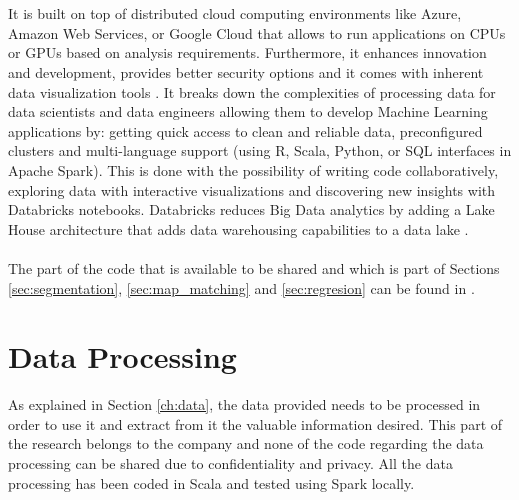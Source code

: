 \\
\\
It is built on top of distributed cloud computing environments like Azure, Amazon Web Services, or Google Cloud that allows to run applications on CPUs or GPUs based on analysis requirements. Furthermore, it enhances innovation and development, provides better security options and it comes with inherent data visualization tools \cite{databricks2}.
It breaks down the complexities of processing data for data scientists and data engineers allowing them to develop Machine Learning applications by: getting quick access to clean and reliable data, preconfigured clusters and multi-language support (using R, Scala, Python, or SQL interfaces in Apache Spark). This is done with the possibility of writing code collaboratively, exploring data with interactive visualizations and discovering new insights with Databricks notebooks. 
Databricks reduces Big Data analytics by adding a Lake House architecture that adds data warehousing capabilities to a data lake \cite{databricks3}.
\\
\\ 
The part of the code that is available to be shared and which is part of Sections \ref{sec:segmentation}, \ref{sec:map_matching} and \ref{sec:regresion} can be found in \cite{git}.


\section{Data Processing}
\label{sec:data_processing}
As explained in Section \ref{ch:data}, the data provided needs to be processed in order to use it and extract from it the valuable information desired. This part of the research belongs to the company and none of the code regarding the data processing can be shared due to confidentiality and privacy. All the data processing has been coded in Scala and tested using Spark locally. 
